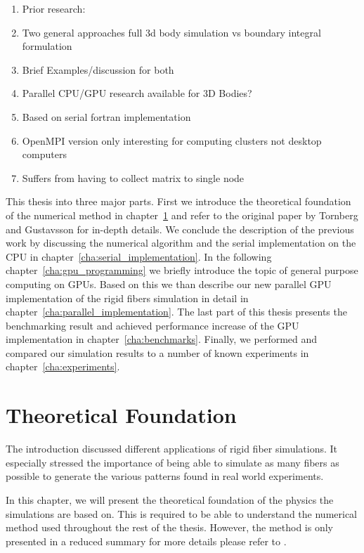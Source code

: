 \documentclass[a4paper,11pt]{kth-mag}
\begin{document}
\begin{enumerate}
\item Prior research:
\item Two general approaches full 3d body simulation vs boundary integral formulation
\item Brief Examples/discussion for both
\item Parallel CPU/GPU research available for 3D Bodies?
\item Based on serial fortran implementation
\item OpenMPI version only interesting for computing clusters not desktop computers
\item Suffers from having to collect matrix to single node
\end{enumerate}


This thesis into three major parts. First we introduce the theoretical foundation of the numerical method in chapter~\ref{cha:theoretical_foundation} and refer to the original paper by Tornberg and Gustavsson for in-depth details. We conclude the description of the previous work by discussing the numerical algorithm and the serial implementation on the CPU in chapter~\ref{cha:serial_implementation}. In the following chapter~\ref{cha:gpu_programming} we briefly introduce the topic of general purpose computing on GPUs. Based on this we than describe our new parallel GPU implementation of the rigid fibers simulation in detail in chapter~\ref{cha:parallel_implementation}. The last part of this thesis presents the benchmarking result and achieved performance increase of the GPU implementation in chapter~\ref{cha:benchmarks}. Finally, we performed and compared our simulation results to a number of known experiments in chapter~\ref{cha:experiments}.

\chapter{Theoretical Foundation}
\label{cha:theoretical_foundation}
The introduction discussed different applications of rigid fiber simulations. It especially stressed the importance of being able to simulate as many fibers as possible to generate the various patterns found in real world experiments.

In this chapter, we will present the theoretical foundation of the physics the simulations are based on. This is required to be able to understand the numerical method used throughout the rest of the thesis. However, the method is only presented in a reduced summary for more details please refer to \cite{}.
\end{document}
